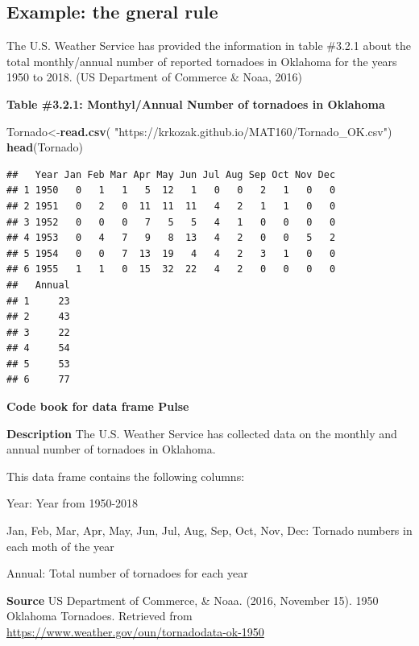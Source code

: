 \documentclass[
]{book}
\newenvironment{Shaded}{\begin{snugshade}}{\end{snugshade}}
\newcommand{\KeywordTok}[1]{\textcolor[rgb]{0.13,0.29,0.53}{\textbf{#1}}}
\newcommand{\NormalTok}[1]{#1}
\newcommand{\StringTok}[1]{\textcolor[rgb]{0.31,0.60,0.02}{#1}}
\begin{document}
\hypertarget{example-the-gneral-rule}{%
\subsection{Example: the gneral rule}\label{example-the-gneral-rule}}

The U.S. Weather Service has provided the information in table \#3.2.1 about the total monthly/annual number of reported tornadoes in Oklahoma for the years 1950 to 2018. (US Department of Commerce \& Noaa, 2016)

\textbf{Table \#3.2.1: Monthyl/Annual Number of tornadoes in Oklahoma}

\begin{Shaded}
\begin{Highlighting}[]
\NormalTok{Tornado<-}\KeywordTok{read.csv}\NormalTok{(}
  \StringTok{"https://krkozak.github.io/MAT160/Tornado_OK.csv"}\NormalTok{)}
\KeywordTok{head}\NormalTok{(Tornado)}
\end{Highlighting}
\end{Shaded}

\begin{verbatim}
##   Year Jan Feb Mar Apr May Jun Jul Aug Sep Oct Nov Dec
## 1 1950   0   1   1   5  12   1   0   0   2   1   0   0
## 2 1951   0   2   0  11  11  11   4   2   1   1   0   0
## 3 1952   0   0   0   7   5   5   4   1   0   0   0   0
## 4 1953   0   4   7   9   8  13   4   2   0   0   5   2
## 5 1954   0   0   7  13  19   4   4   2   3   1   0   0
## 6 1955   1   1   0  15  32  22   4   2   0   0   0   0
##   Annual
## 1     23
## 2     43
## 3     22
## 4     54
## 5     53
## 6     77
\end{verbatim}

\textbf{Code book for data frame Pulse}

\textbf{Description}
The U.S. Weather Service has collected data on the monthly and annual number of tornadoes in Oklahoma.

This data frame contains the following columns:

Year: Year from 1950-2018

Jan, Feb, Mar, Apr, May, Jun, Jul, Aug, Sep, Oct, Nov, Dec: Tornado numbers in each moth of the year

Annual: Total number of tornadoes for each year

\textbf{Source}
US Department of Commerce, \& Noaa. (2016, November 15). 1950 Oklahoma Tornadoes. Retrieved from \url{https://www.weather.gov/oun/tornadodata-ok-1950}
\end{document}
